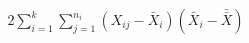 \documentclass[preview]{standalone}
\begin{document}
\begin{align*}
2\sum_{i=1}^{k} \sum_{j=1}^{n_i} (X_{ij} - \bar{X}_i)(\bar{X}_i - \bar{\bar{X}})
\end{align*}
\end{document}
